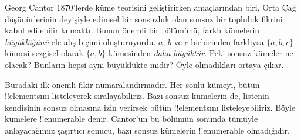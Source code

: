 



Georg Cantor 1870'lerde küme teorisini geliştirirken amaçlarından biri, Orta
Çağ düşünürlerinin deyişiyle edimsel bir sonsuzluk olan sonsuz bir topluluk
fikrini kabul edilebilir kılmaktı. Bunun önemli bir bölümünü, farklı kümelerin
\emph{büyüklüğünü} ele alış biçimi oluşturuyordu. $a$, $b$ ve $c$ birbirinden
farklıysa $\{a, b, c\}$ kümesi sezgisel olarak $\{a, b\}$ kümesinden
\emph{daha büyüktür}. Peki sonsuz kümeler ne olacak? Bunların hepsi aynı
büyüklükte midir? Öyle olmadıkları ortaya çıkar.

Buradaki ilk önemli fikir numaralandırmadır. Her sonlu kümeyi, bütün
!!{element}s{}ını listeleyerek sıralayabiliriz. Bazı sonsuz kümelerin de,
listenin kendisinin sonsuz olmasına izin verirsek bütün !!{element}s{}ını
listeleyebiliriz. Böyle kümelere !!{enumerable} denir. Cantor'un bu bölümün
sonunda tümüyle anlayacağımız şaşırtıcı sonucu, bazı sonsuz kümelerin
!!{enumerable} olmadığıdır.

